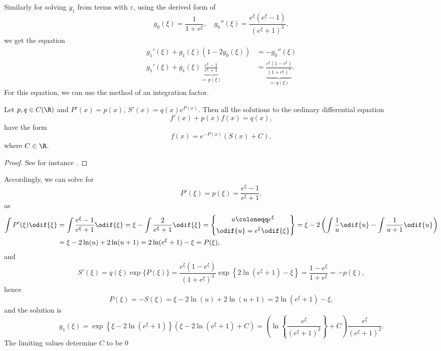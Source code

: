 Similarly for solving \(g_1\) from terms with \(\varepsilon\), using the derived form of \[
    g_0(\xi) = \frac{1}{1 + e^{\xi}}, \quad g_0''(\xi) = \frac{e^{\xi} (e^{\xi} - 1)}{(e^{\xi} + 1)^3},
    \] we get the equation 
    \begin{align*}
        g_1'(\xi) + g_1(\xi)(1 - 2g_0(\xi)) &= -g_0''(\xi) \\
        g_1'(\xi) + g_1(\xi)\underbrace{\frac{e^{\xi} - 1}{e^{\xi} + 1}}_{\eqqcolon p(\xi)} &= \underbrace{\frac{e^{\xi}(1
        - e^{\xi})}{(1 + e^{\xi})^3}}_{\eqqcolon q(\xi)}.
    \end{align*}
For this equation, we can use the method of an integration factor.
\begin{theorem}
  Let \(p,q \in C(\R)\) and \(P'(x) = p(x)\), \(S'(x) = q(x) e^{P(x)}\).
  Then all the solutions to the ordinary differential equation \[
      f'(x) + p(x) f(x) = q(x),
  \] have the form \[
  f(x) = e^{-P(x)} (S(x) + C),
  \] where \(C \in \R\).
\end{theorem}
\begin{proof}
    See for instance \cite{krbalek2019}.
\end{proof}
Accordingly, we can solve for 
    \begin{equation*}
        P'(\xi) = p(\xi) = \frac{e^{\xi} - 1}{e^{\xi} + 1},
    \end{equation*}
    as
    \begin{align*}
        \int P'(\xi) \odif{\xi} &= \int \frac{e^{\xi} - 1}{e^{\xi} + 1} \odif{\xi} = \xi - \int \frac{2}{e^{\xi}
        + 1}\odif{\xi} = \left\{\begin{gathered}
           u \coloneqq e^{\xi} \\
           \odif{u} = e^{\xi} \odif{\xi}
   \end{gathered} \right\} = \xi - 2 \left(  \int\frac{1}{u} \odif{u} - \int\frac{1}{u + 1} \odif{u}\right) \\
                                &= \xi - 2 \ln(u) + 2 \ln(u + 1) = 2 \ln (e^{\xi} + 1)
                                - \xi = P(\xi),
    \end{align*}
    and
    \begin{equation*}
        S'(\xi) = q(\xi) \exp\{P(\xi)\} = \frac{e^{\xi}(1 - e^{\xi})}{(1 + e^{\xi})^3} \exp \left\{
        2 \ln(e^{\xi} + 1) - \xi\right\} = \frac{1 - e^{\xi}}{1 + e^{\xi}} = -p(\xi),
    \end{equation*}
    hence \begin{equation*}
      P(\xi) = -S(\xi) = \xi - 2 \ln(u) + 2 \ln(u + 1) = 2 \ln (e^{\xi} + 1) - \xi,
    \end{equation*}
    and the solution is \begin{equation}
      \label{eq:g-1}
      g_1(\xi) = \exp \left\{ \xi - 2 \ln(e^{\xi} + 1) \right\} \left( \xi - 2 \ln (e^{\xi} + 1) + C \right) = \left(
      \ln \left\{ \frac{e^{\xi}}{(e^{\xi} + 1)^2} \right\} + C \right) \frac{e^{\xi}}{(e^{\xi} + 1)^2}.
    \end{equation}
The limiting values determine \(C\) to be \(0\)

